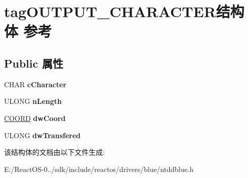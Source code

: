 \hypertarget{structtag_o_u_t_p_u_t___c_h_a_r_a_c_t_e_r}{}\section{tag\+O\+U\+T\+P\+U\+T\+\_\+\+C\+H\+A\+R\+A\+C\+T\+E\+R结构体 参考}
\label{structtag_o_u_t_p_u_t___c_h_a_r_a_c_t_e_r}
\subsection*{Public 属性}
\begin{DoxyCompactItemize}
\item 
\mbox{\label{structtag_o_u_t_p_u_t___c_h_a_r_a_c_t_e_r_a8a6bad9970ac7daf8b9f5ff1a3c915fe}} 
C\+H\+AR {\bfseries c\+Character}
\item 
\mbox{\label{structtag_o_u_t_p_u_t___c_h_a_r_a_c_t_e_r_ab83671e44d7224c78796854e6214763e}} 
U\+L\+O\+NG {\bfseries n\+Length}
\item 
\mbox{\label{structtag_o_u_t_p_u_t___c_h_a_r_a_c_t_e_r_aa092c3e3242c4266dcfc3add2a7c0e06}} 
\hyperlink{struct___c_o_o_r_d}{C\+O\+O\+RD} {\bfseries dw\+Coord}
\item 
\mbox{\label{structtag_o_u_t_p_u_t___c_h_a_r_a_c_t_e_r_aa03f0b140b19d1b8649ed822ac865959}} 
U\+L\+O\+NG {\bfseries dw\+Transfered}
\end{DoxyCompactItemize}


该结构体的文档由以下文件生成\+:\begin{DoxyCompactItemize}
\item 
E\+:/\+React\+O\+S-\/0../sdk/include/reactos/drivers/blue/ntddblue.\+h\end{DoxyCompactItemize}
